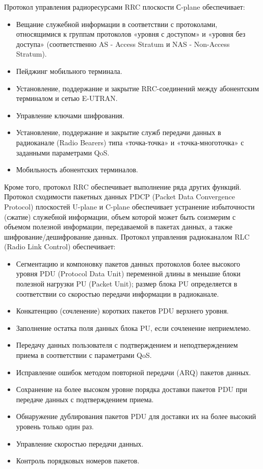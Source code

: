Протокол управления радиоресурсами RRC плоскости С-plane обеспечивает:
\begin{itemize}
  \item Вещание служебной информации в соответствии с протоколами, относящимися к группам протоколов «уровня с доступом» и «уровня без доступа» (соответственно AS - Access Stratum и NAS - Non-Access Stratum).
  \item Пейджинг мобильного терминала.
  \item Установление, поддержание и закрытие RRC-соединений между абонентским терминалом и сетью E-UTRAN.
  \item Управление ключами шифрования.
  \item Установление, поддержание и закрытие служб передачи данных в радиоканале (Radio Bearers) типа «точка-точка» и «точка-многоточка» с заданными параметрами QoS.
  \item Мобильность абонентских терминалов.
\end{itemize}
Кроме того, протокол RRC обеспечивает выполнение ряда других функций.
Протокол сходимости пакетных данных PDCP (Packet Data Convergence Protocol) плоскостей U-plane и C-plane обеспечивает устранение избыточности (сжатие) служебной информации, объем которой может быть соизмерим с объемом полезной информации, передаваемой в пакетах данных, а также шифрование/дешифрование данных.
Протокол управления радиоканалом RLC (Radio Link Control) обеспечивает:
\begin{itemize}
  \item Сегментацию и компоновку пакетов данных протоколов более высокого уровня PDU (Protocol Data Unit) переменной длины в меньшие блоки полезной нагрузки PU (Packet Unit); размер блока PU определяется в соответствии со скоростью передачи информации в радиоканале.
  \item Конкатенцию (сочленение) коротких пакетов PDU верхнего уровня.
  \item Заполнение остатка поля данных блока PU, если сочленение неприемлемо.
  \item Передачу данных пользователя с подтверждением и неподтверждением приема в соответствии с параметрами QoS.
  \item Исправление ошибок методом повторной передачи (ARQ) пакетов данных.
  \item Сохранение на более высоком уровне порядка доставки пакетов PDU при передаче данных с подтверждением приема.
  \item Обнаружение дублирования пакетов PDU для доставки их на более высокий уровень только один раз.
  \item Управление скоростью передачи данных.
  \item Контроль порядковых номеров пакетов.
\end{itemize}


